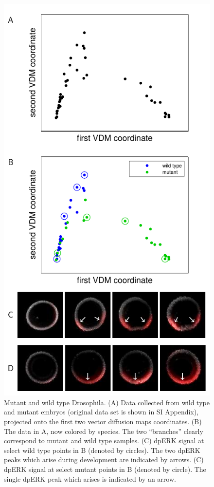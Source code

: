 \documentclass{pnastwo}
\begin{document}
\begin{article}
\begin{figure}[t]
\includegraphics{fig5}
\caption{Mutant and wild type {\xfigtextfontit Drosophila}.  {\xfigtextfontit(A)} Data collected from wild type and mutant embryos (original data set is shown in {\xfigtextfontit SI Appendix}), projected onto the first two vector diffusion maps coordinates. {\xfigtextfontit (B)} The data in {\xfigtextfontit A}, now colored by species. The two ``branches'' clearly correspond to mutant and wild type samples. {\xfigtextfontit (C)} dpERK signal at select wild type points in {\xfigtextfontit B} (denoted by circles). The two dpERK peaks which arise during development are indicated by arrows. {\xfigtextfontit (C)} dpERK signal at select mutant points in {\xfigtextfontit B} (denoted by circle). The single dpERK peak which arises is indicated by an arrow. }

\end{figure}
\end{article}
\end{document}
